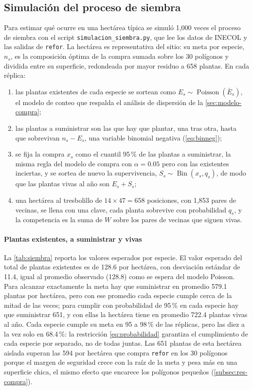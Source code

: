 \subsection{Simulación del proceso de siembra}
\label{subsec:simulacion}

Para estimar qué ocurre en una hectárea típica se simuló 1{,}000 veces el proceso de siembra con el script \texttt{simulacion\_siembra.py}, que lee los datos de INECOL y las salidas de \texttt{refor}. La hectárea es representativa del sitio: su meta por especie, $n_s$, es la composición óptima de la compra sumada sobre los 30 polígonos y dividida entre su superficie, redondeada por mayor residuo a 658 plantas. En cada réplica:
\begin{enumerate}
  \item las plantas existentes de cada especie se sortean como $E_s\sim\operatorname{Poisson}(\bar{E}_s)$, el modelo de conteo que respalda el análisis de dispersión de la \cref{sec:modelo-compra};
  \item las plantas a suministrar son las que hay que plantar, una tras otra, hasta que sobrevivan $n_s-E_s$, una variable binomial negativa (\cref{eq:binneg});
  \item se fija la compra $x_s$ como el cuantil 95\,\% de las plantas a suministrar, la misma regla del modelo de compra con $\alpha=0.05$ pero con las existentes inciertas, y se sortea de nuevo la supervivencia, $S_s\sim\operatorname{Bin}(x_s,q_s)$, de modo que las plantas vivas al año son $E_s+S_s$;
  \item una hectárea al tresbolillo de $14\times47=658$ posiciones, con 1{,}853 pares de vecinas, se llena con una clave, cada planta sobrevive con probabilidad $q_s$, y la competencia es la suma de $W$ sobre los pares de vecinas que siguen vivas.
\end{enumerate}

\paragraph{Plantas existentes, a suministrar y vivas} La \cref{tab:siembra} reporta los valores esperados por especie. El valor esperado del total de plantas existentes es de 128.6 por hectárea, con desviación estándar de 11.4, igual al promedio observado (128.8) como se espera del modelo Poisson. Para alcanzar exactamente la meta hay que suministrar en promedio 579.1 plantas por hectárea, pero con ese promedio cada especie cumple cerca de la mitad de las veces; para cumplir con probabilidad de 95\,\% en cada especie hay que suministrar 651, y con ellas la hectárea tiene en promedio 722.4 plantas vivas al año. Cada especie cumple su meta en 95 a 98\,\% de las réplicas, pero las diez a la vez solo en 68.4\,\%: la restricción \eqref{eq:probabilidad} garantiza el cumplimiento de cada especie por separado, no de todas juntas. Las 651 plantas de esta hectárea aislada superan las 594 por hectárea que compra \texttt{refor} en los 30 polígonos porque el margen de seguridad crece con la raíz de la meta y pesa más en una superficie chica, el mismo efecto que encarece los polígonos pequeños (\cref{subsec:res-compra}).


